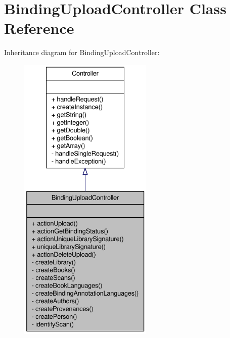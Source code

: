 \hypertarget{classBindingUploadController}{
\section{BindingUploadController Class Reference}
\label{classBindingUploadController}
}


Inheritance diagram for BindingUploadController:\nopagebreak
\begin{figure}[H]
\begin{center}
\leavevmode
\includegraphics[height=400pt]{classBindingUploadController__inherit__graph}
\end{center}
\end{figure}



